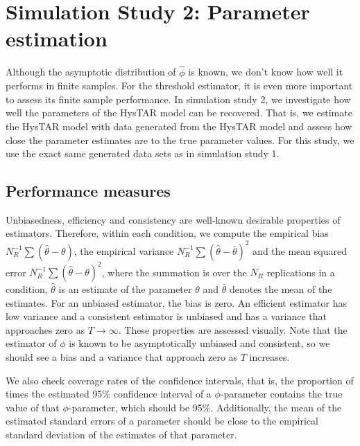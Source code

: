 \documentclass{article}
\begin{document}


\section{Simulation Study 2: Parameter estimation}
\label{sec:simulation_study_2}
Although the asymptotic distribution of $\hat{\phi}$ is known, we don't know how well it performs in finite samples.
For the threshold estimator, it is even more important to assess its finite sample performance.
In simulation study 2, we investigate how well the parameters of the HysTAR model can be recovered. That is, we estimate the HysTAR model with data generated from the HysTAR model and assess how close the parameter estimates are to the true parameter values.
For this study, we use the exact same generated data sets as in simulation study 1.

\subsection{Performance measures}
Unbiasedness, efficiency and consistency are well-known desirable properties of estimators. Therefore, within each condition, we compute the empirical bias $N_R^{-1} \sum (\hat{\theta} - \theta)$, the empirical variance $N_R^{-1} \sum (\hat{\theta} - \bar{\theta})^2$ and the mean squared error $N_R^{-1} \sum (\hat{\theta} - \theta)^2$, where the summation is over the $N_R$ replications in a condition, $\hat{\theta}$ is an estimate of the parameter $\theta$ and $\bar{\theta}$ denotes the mean of the estimates.
For an unbiased estimator, the bias is zero.
An efficient estimator has low variance and a consistent estimator is unbiased and has a variance that approaches zero as $T \rightarrow \infty$.
These properties are assessed visually.
Note that the estimator of $\phi$ is known to be asymptotically unbiased and consistent, so we should see a bias and a variance that approach zero as $T$ increases.

We also check coverage rates of the confidence intervals, that is, the proportion of times the estimated 95\% confidence interval of a $\phi$-parameter contains the true value of that $\phi$-parameter, which should be 95\%. Additionally, the mean of the estimated standard errors of a parameter should be close to the empirical standard deviation of the estimates of that parameter.
\end{document}
